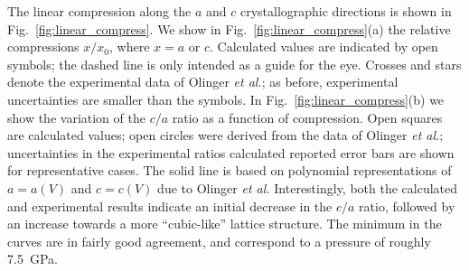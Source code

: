 \documentclass[prb,aps,nobibnotes,twocolumn,doublespace,twocolumngrid,superbib]{revtex4}
\begin{document}
The linear compression along the $a$ and $c$ crystallographic directions
is shown in Fig.~\ref{fig:linear_compress}.  We show in 
Fig.~\ref{fig:linear_compress}(a) the relative compressions $x/x_0$, 
where $x=a$ or $c$.  Calculated values are indicated by open symbols; the 
dashed line is only intended as a guide for the eye.  Crosses and stars 
denote the experimental data of Olinger {\it et al.}; as before, experimental 
uncertainties are smaller than the symbols.  
In Fig.~\ref{fig:linear_compress}(b) we show the variation
of the $c/a$ ratio as a function of compression.  Open squares are 
calculated values; open circles were derived from the data of Olinger
{\it et al.}; uncertainties in the experimental ratios calculated reported 
error bars are shown for representative cases.  The solid line is based
on polynomial representations of $a=a(V)$ and $c=c(V)$ due to Olinger
{\it et al.} Interestingly, both the calculated and experimental results indicate
an initial decrease in the $c/a$ ratio, followed by an increase 
towards a more ``cubic-like'' lattice structure.  The minimum in the
curves are in fairly good agreement, and correspond to a pressure of 
roughly 7.5~GPa.
\end{document}
